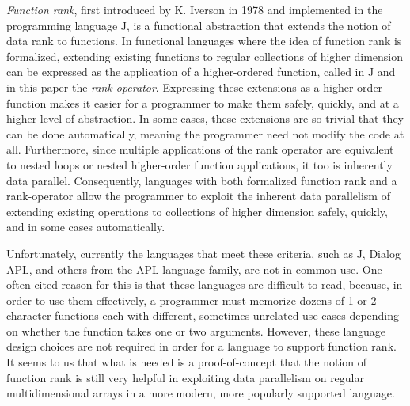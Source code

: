 \textit{Function rank}, first introduced by K. Iverson in 1978\cite{opandfunc} and implemented in the programming language J, is a functional abstraction that extends the notion of data rank to functions. %
In functional languages where the idea of function rank is formalized, extending existing functions to regular collections of higher dimension can be expressed as the application of a higher-ordered function, 
called in J and in this paper the \textit{rank operator}. %
Expressing these extensions as a higher-order function makes it easier for a programmer to make them safely, quickly, and at a higher level of abstraction.
In some cases, these extensions are so trivial that they can be done automatically, meaning the programmer need not modify the code at all. %
Furthermore, since multiple applications of the rank operator are equivalent to nested loops or nested higher-order function applications, it too is inherently data parallel.
Consequently, languages with both formalized function rank and a rank-operator allow the programmer to 
exploit the inherent data parallelism of extending existing operations to collections of higher dimension safely, quickly, and in some cases automatically.

Unfortunately, currently the languages that meet these criteria, such as J, Dialog APL, and others from the APL language family, are not in common use.
One often-cited reason for this is that these languages are difficult to read, %
because, in order to use them effectively, a programmer must memorize dozens of 1 or 2 character functions each with different, sometimes unrelated use cases depending on whether the function takes one or two arguments.\cite{jvocab} %
However, these language design choices are not required in order for a language to support function rank.
It seems to us that what is needed is a proof-of-concept that the notion of function rank is still very helpful in exploiting data parallelism on regular multidimensional arrays in a more modern, more popularly supported language.


